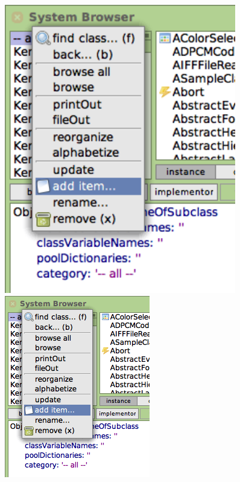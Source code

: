 \documentclass[a4paper,10pt,twoside]{book}
\begin{document}
\begin{figure}[htb]
\begin{minipage}[b]{0.48\textwidth}
\ifluluelse
	{\centerline {\includegraphics[width=0.9\textwidth]{AddCategory}}}
	{\centerline {\includegraphics[scale=0.7]{AddCategory}}}

\end{minipage}
\end{figure}
\end{document}
